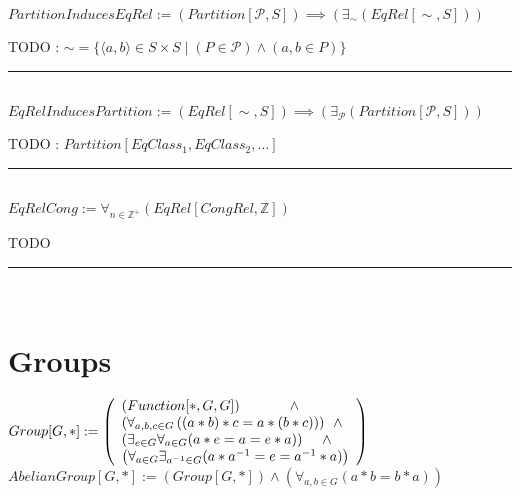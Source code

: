 \documentclass{book}
\newcommand{\abr}{:=}
\newcommand{\pr}[1]{\left(#1\right)}
\newcommand{\st}{\mathbin{|}}
\begin{document}
$PartitionInducesEqRel \abr (Partition[\mathcal{P}, S]) \implies \pr{\exists_{\sim}(EqRel[\sim, S])}$
\begin{enumerate}
  \lit TODO : $\sim = \{\langle a, b \rangle \in S \times S \st (P \in \mathcal{P}) \land (a, b \in P)\}$
\end{enumerate} \vspace{.75mm} \hrule \vspace{.75mm} \ \\

$EqRelInducesPartition \abr (EqRel[\sim, S]) \implies \pr{\exists_{\mathcal{P}}(Partition[\mathcal{P}, S])}$
\begin{enumerate}
  \lit TODO : $Partition[EqClass_1, EqClass_2, \ldots]$
\end{enumerate} \vspace{.75mm} \hrule \vspace{.75mm} \ \\

$EqRelCong \abr \forall_{n \in \mathbb{Z}^+}(EqRel[CongRel, \mathbb{Z}])$
\begin{enumerate}
  \lit TODO
\end{enumerate} \vspace{.75mm} \hrule \vspace{.75mm} \ \\


\section{Groups}
$Group[G, *] \abr \left(\begin{array}{ll}
  (Function[*, G, G]) \hfill \land \hfill \\ %
  \pr{\forall_{a, b, c \in G}\pr{(a * b) * c = a * (b * c)}} \hfill \land \hfill \\ %
  \pr{\exists_{e \in G} \forall_{a \in G}(a * e = a = e * a)} \hfill \land \hfill \\ %
  \pr{\forall_{a \in G} \exists_{a^{-1} \in G}(a * a^{-1} = e = a^{-1} * a)}
\end{array}\right)$ \\
$AbelianGroup[G, *] \abr (Group[G, *]) \land \pr{\forall_{a, b \in G}(a * b = b * a)}$ \\
\end{document}
